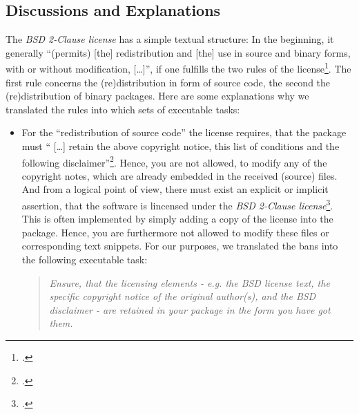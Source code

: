 \subsection{Discussions and Explanations}

The \textit{BSD 2-Clause license} has a simple textual structure: In the
beginning, it generally \enquote{(permits) [the] redistribution and [the] use in
source and binary forms, with or without modification, [\ldots]}, if one
fulfills the two rules of the license\footcite[cf.][\nopage
wp]{BsdLicense2Clause}. The first rule concerns the (re)distribution in form of
source code, the second the (re)distribution of binary packages. Here are some
explanations why we translated the rules into which sets of executable tasks:

\begin{itemize}
\item For the \enquote{redistribution of source code} the license requires,
that the package must \enquote{ [\ldots] retain the above copyright notice, this
list of conditions and the following disclaimer}\footcite[cf.][\nopage
wp]{BsdLicense2Clause}. Hence, you are not allowed, to modify any of the
copyright notes, which are already embedded in the received (source) files. And
from a logical point of view, there must exist an explicit or implicit
assertion, that the software is lincensed under the \textit{BSD 2-Clause
license}\footcite[The BSD license requires, that a re-distributed software
package must contain the (package specific) copyright notice, the (license
specific) conditions and the BSD discaimer. (cf.][\nopage wp.) You might ask
what you should do, if these elements are missed in the package you got. If so,
the package you got had not been licensed adequately. Hence, you do not know
reliably whether you have received it under a BSD license. In other words: If
you have received a BSD licensed software package, it must contain sufficient
license fulfilling elements, or it is not a BSD licensed
software]{BsdLicense2Clause}. This is often implemented by simply adding a copy
of the license into the package. Hence, you are furthermore not allowed to
modify these files or corresponding text snippets. For our purposes, we
translated the bans into the following executable task:

\begin{quote}\textit{Ensure, that the licensing elements - e.g. the BSD license
text, the specific copyright notice of the original author(s), and the BSD disclaimer
- are retained in your package in the form you have got them.}\end{quote}


\end{itemize}
